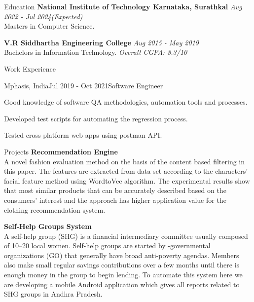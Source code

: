 \documentclass{Resume_Chinnapareddy_2220570}
\begin{document}
\begin{rSection}{Education}
{\bf National Institute of Technology Karnataka, Surathkal} \hfill {\em Aug 2022 - Jul 2024(Expected)} 
\\ Masters in Computer Science.

{\bf V.R Siddhartha Engineering College} \hfill {\em Aug 2015 - May 2019} 
\\ Bachelors in Information Technology. \hfill {\em Overall CGPA: 8.3/10}
\end{rSection}

\begin{rSection}{Work Experience}
\begin{rSubsection}{Mphasis, India}{Jul 2019 - Oct 2021}{Software Engineer}{}
 \item Good knowledge of software QA methodologies, automation tools and processes.
 \item Developed test scripts for automating the regression process.
 \item Tested cross platform web apps using postman API.
 \end{rSubsection}
\end{rSection}

\begin{rSection}{Projects}
{\bf Recommendation Engine}
\\A novel fashion evaluation method on the basis of the content based filtering in this
paper. The features are extracted from data set according to the characters’ facial feature
method using WordtoVec algorithm. The experimental results show that most similar products that can be accurately described based on the consumers’ interest and the approach has higher application value for the clothing recommendation system.

{\bf Self-Help Groups System}
\\A self-help group (SHG) is a financial intermediary committee usually
composed of 10–20 local women. Self-help groups are started by -governmental
organizations (GO) that generally have broad anti-poverty agendas. Members also make
small regular savings contributions over a few months until there is enough money in the
group to begin lending. To automate this system here we are developing a mobile Android
application which gives all reports related to SHG groups in Andhra Pradesh.
\end{rSection}
\end{document}
